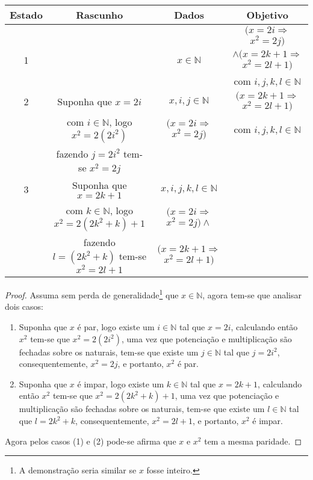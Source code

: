 \begin{exem}
	\begin{table*}[h]
		\centering
		\scriptsize
		\begin{tabular}{c|c|c|c}
			\hline
			\rowcolor{cinzaClaro}
			Estado & Rascunho & Dados & Objetivo\\
			\hline
			& & & $(x = 2i \Rightarrow$ $x^2 = 2j)$\\ 
			1& & $x \in \mathbb{N}$ & $\land (x = 2k + 1 \Rightarrow$ $x^2 = 2l + 1)$\\
			& & & com $i, j, k, l \in \mathbb{N}$\\
			2 & Suponha que $x = 2i$ & $x, i,j \in \mathbb{N}$ & $(x = 2k + 1 \Rightarrow$ $x^2 = 2l + 1)$\\ 
			& com $i \in \mathbb{N}$, logo $x^2 = 2(2i^2)$ & $(x = 2i \Rightarrow$ $x^2 = 2j)$ & com $i, j, k, l \in \mathbb{N}$\\
			& fazendo $j = 2i^2$ tem-se $x^2 = 2j$ & &\\
			3 & Suponha que $x = 2k + 1$ & $x, i,j, k, l \in \mathbb{N}$ &\\
			& com $k \in \mathbb{N}$, logo $x^2 = 2 (2k^2 + k) + 1$ & $(x = 2i \Rightarrow$ $x^2 = 2j) \land$ & \\
			& fazendo $l = (2k^2 + k)$ tem-se $x^2 = 2l+1$ & $(x = 2k + 1 \Rightarrow$ $x^2 = 2l + 1)$ &\\
			\hline
		\end{tabular}
	\end{table*} 
	\begin{proof}
		Assuma sem perda de generalidade\footnote{A demonstração seria similar se $x$ fosse inteiro.} que $x \in \mathbb{N}$,  agora tem-se que analisar dois casos:
		\begin{enumerate}
			\item Suponha que $x$ é par, logo existe um $i \in \mathbb{N}$ tal que $x = 2i$, calculando então $x^2$ tem-se que $x^2 = 2(2i^2)$, uma vez que potenciação e multiplicação são fechadas sobre os naturais, tem-se que existe um $j \in \mathbb{N}$ tal que $j = 2i^2$, consequentemente, $x^2 = 2j$, e portanto, $x^2$ é par.
			\item Suponha que $x$ é impar, logo existe um $k \in \mathbb{N}$ tal que $x = 2k + 1$, calculando então $x^2$ tem-se que $x^2 = 2(2k^2 + k) + 1$, uma vez que potenciação e multiplicação são fechadas sobre os naturais, tem-se que existe um $l \in \mathbb{N}$ tal que $l = 2k^2 + k$, consequentemente, $x^2 = 2l + 1$, e portanto, $x^2$ é impar.
		\end{enumerate}
		Agora pelos casos (1) e (2) pode-se afirma que $x$ e $x^2$ tem a mesma paridade. 
	\end{proof}
\end{exem}

